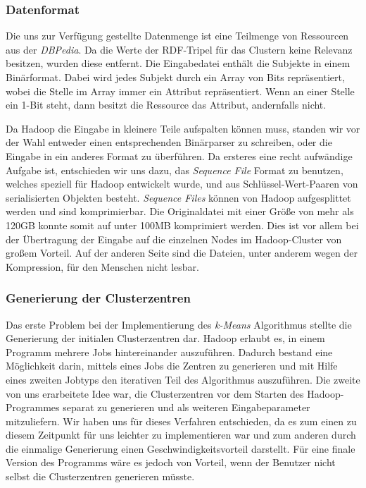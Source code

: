 \documentclass[a4paper]{llncs}
\begin{document}
\subsubsection{Datenformat}
Die uns zur Verfügung gestellte Datenmenge ist eine Teilmenge von Ressourcen aus der \emph{DBPedia}.
Da die Werte der RDF-Tripel für das Clustern keine Relevanz besitzen, wurden diese entfernt.
Die Eingabedatei enthält die Subjekte in einem Binärformat. Dabei wird jedes Subjekt durch ein Array von Bits repräsentiert, wobei die Stelle im Array immer ein Attribut repräsentiert. Wenn an einer Stelle ein 1-Bit steht, dann besitzt die Ressource das Attribut, andernfalls nicht.

Da Hadoop die Eingabe in kleinere Teile aufspalten können muss, standen wir vor der Wahl entweder einen entsprechenden Binärparser zu schreiben, oder die Eingabe in ein anderes Format zu überführen.
Da ersteres eine recht aufwändige Aufgabe ist, entschieden wir uns dazu, das \emph{Sequence File} Format zu benutzen, welches speziell für Hadoop entwickelt wurde, und aus Schlüssel-Wert-Paaren von serialisierten Objekten besteht.
\emph{Sequence Files} können von Hadoop aufgesplittet werden und sind komprimierbar. 
Die Originaldatei mit einer Größe von mehr als 120GB konnte somit auf unter 100MB komprimiert werden.
Dies ist vor allem bei der Übertragung der Eingabe auf die einzelnen Nodes im Hadoop-Cluster von großem Vorteil.
Auf der anderen Seite sind die Dateien, unter anderem wegen der Kompression, für den Menschen nicht lesbar.

\subsubsection{Generierung der Clusterzentren}
Das erste Problem bei der Implementierung des \emph{k-Means} Algorithmus stellte die Generierung der initialen Clusterzentren dar. Hadoop erlaubt es, in einem Programm mehrere Jobs hintereinander auszuführen. Dadurch bestand eine Möglichkeit darin, mittels eines Jobs die Zentren zu generieren und mit Hilfe eines zweiten Jobtyps den iterativen Teil des Algorithmus auszuführen. Die zweite von uns erarbeitete Idee war, die Clusterzentren vor dem Starten des Hadoop-Programmes separat zu generieren und als weiteren Eingabeparameter mitzuliefern. Wir haben uns für dieses Verfahren entschieden, da es zum einen zu diesem Zeitpunkt für uns leichter zu implementieren war und zum anderen durch die einmalige Generierung einen Geschwindigkeitsvorteil darstellt. Für eine finale Version des Programms wäre es jedoch von Vorteil, wenn der Benutzer nicht selbst die Clusterzentren generieren müsste.
\end{document}
